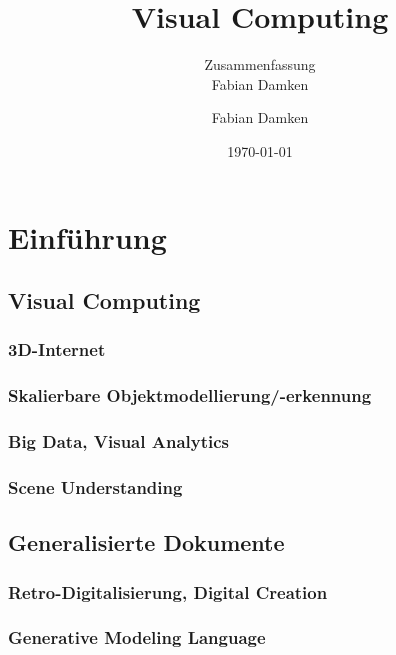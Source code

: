\documentclass[a4paper, 11pt, accentcolor = tud3b]{tudreport}
\title{Visual Computing}
\subtitle{Zusammenfassung \\ Fabian Damken}
\author{Fabian Damken}
\date{\today}
\begin{document}
	\maketitle
	\tableofcontents
	\listoftodos

	\chapter{Einführung} %

		\section{Visual Computing} %

			\subsection{3D-Internet} %

			\subsection{Skalierbare Objektmodellierung/-erkennung} %

			\subsection{Big Data, Visual Analytics} %

			\subsection{Scene Understanding} %

		\section{Generalisierte Dokumente} %

			\subsection{Retro-Digitalisierung, Digital Creation} %

			\subsection{Generative Modeling Language} %
\end{document}

